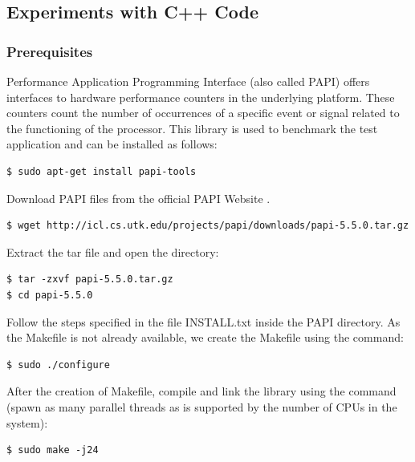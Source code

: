 \subsection{Experiments with C++ Code}
\label{3_1_2}

\subsubsection{Prerequisites}
\label{3_1_2_1}
Performance Application Programming Interface (also called PAPI) offers interfaces to hardware performance counters in the underlying platform. These counters count the number of occurrences of a specific event or signal related to the functioning of the processor. This library is used to benchmark the test application and can be installed as follows:
\begin{scriptsize}
\linuxbash
\begin{lstlisting}
$ sudo apt-get install papi-tools
\end{lstlisting}
\end{scriptsize}
Download PAPI files from the official PAPI Website \cite{papi_official}.
\begin{scriptsize}
\linuxbash
\begin{lstlisting}
$ wget http://icl.cs.utk.edu/projects/papi/downloads/papi-5.5.0.tar.gz
\end{lstlisting}
\end{scriptsize}
Extract the tar file and open the directory:
\begin{scriptsize}
\linuxbash
\begin{lstlisting}
$ tar -zxvf papi-5.5.0.tar.gz
$ cd papi-5.5.0
\end{lstlisting}
\end{scriptsize}
Follow the steps specified in the file INSTALL.txt inside the PAPI directory.\newline
As the Makefile is not already available, we create the Makefile using the command:
\begin{scriptsize}
\linuxbash
\begin{lstlisting}
$ sudo ./configure
\end{lstlisting}
\end{scriptsize}
After the creation of Makefile, compile and link the library using the command (spawn as many parallel threads as is supported by the number of CPUs in the system):
\begin{scriptsize}
\linuxbash
\begin{lstlisting}
$ sudo make -j24
\end{lstlisting}
\end{scriptsize}
